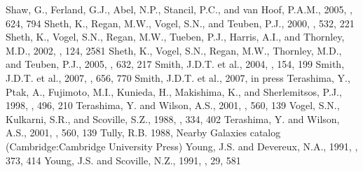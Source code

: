 \documentclass[manuscript]{aastex}
\begin{document}
\begin{thebibliography}{}
 Shaw, G., Ferland, G.J., Abel, N.P., Stancil, P.C., and van Hoof, P.A.M., 2005, \apj, 624, 794
 Sheth, K., Regan, M.W., Vogel, S.N., and Teuben, P.J., 2000, \apj, 532, 221 
 Sheth, K., Vogel, S.N., Regan, M.W., Tueben, P.J., Harris, A.I., and Thornley, M.D., 2002, \aj, 124, 2581
 Sheth, K., Vogel, S.N., Regan, M.W., Thornley, M.D., and Teuben, P.J., 2005, \apj, 632, 217
 Smith, J.D.T. et al., 2004, \apjs, 154, 199
 Smith, J.D.T. et al., 2007, \apj, 656, 770
 Smith, J.D.T. et al., 2007, in press
 Terashima, Y., Ptak, A., Fujimoto, M.I., Kunieda, H., Makishima, K., and Sherlemitsos, P.J., 1998, \apj, 496, 210
 Terashima, Y. and Wilson, A.S., 2001, \apj, 560, 139
 Vogel, S.N., Kulkarni, S.R., and Scoville, S.Z., 1988, \nat, 334, 402
 Terashima, Y. and Wilson, A.S., 2001, \apj, 560, 139
 Tully, R.B. 1988, Nearby Galaxies catalog (Cambridge:Cambridge University Press)
 Young, J.S. and Devereux, N.A., 1991, \apj, 373, 414
 Young, J.S. and Scoville, N.Z., 1991, \araa, 29, 581
\end{thebibliography}

\clearpage
\end{document}
